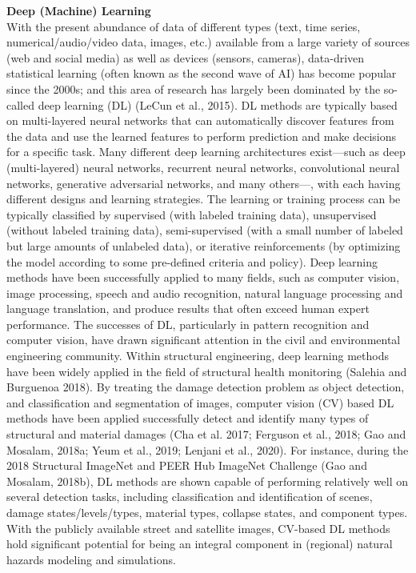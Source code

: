 \noindent\textbf{Deep (Machine) Learning} \\With the present abundance of data of different types (text, time series, numerical/audio/video data, images, etc.) available from a large variety of sources (web and social media) as well as devices (sensors, cameras), data-driven statistical learning (often known as the second wave of AI) has become popular since the 2000s; and this area of research has largely been dominated by the so-called deep learning (DL) (LeCun et al., 2015). DL methods are typically based on multi-layered neural networks that can automatically discover features from the data and use the learned features to perform prediction and make decisions for a specific task. Many different deep learning architectures exist—such as deep (multi-layered) neural networks, recurrent neural networks, convolutional neural networks, generative adversarial networks, and many others—, with each having different designs and learning strategies. The learning or training process can be typically classified by supervised (with labeled training data), unsupervised (without labeled training data), semi-supervised (with a small number of labeled but large amounts of unlabeled data), or iterative reinforcements (by optimizing the model according to some pre-defined criteria and policy). Deep learning methods have been successfully applied to many fields, such as computer vision, image processing, speech and audio recognition, natural language processing and language translation, and produce results that often exceed human expert performance. The successes of DL, particularly in pattern recognition and computer vision, have drawn significant attention in the civil and environmental engineering community. Within structural engineering, deep learning methods have been widely applied in the field of structural health monitoring (Salehia and Burguenoa 2018). By treating the damage detection problem as object detection, and classification and segmentation of images, computer vision (CV) based DL methods have been applied successfully detect and identify many types of structural and material damages (Cha et al. 2017; Ferguson et al., 2018; Gao and Mosalam, 2018a; Yeum et al., 2019; Lenjani et al., 2020). For instance, during the 2018 Structural ImageNet and PEER Hub ImageNet Challenge (Gao and Mosalam, 2018b), DL methods are shown capable of performing relatively well on several detection tasks, including classification and identification of scenes, damage states/levels/types, material types, collapse states, and component types. With the publicly available street and satellite images, CV-based DL methods hold significant potential for being an integral component in (regional) natural hazards modeling and simulations.

